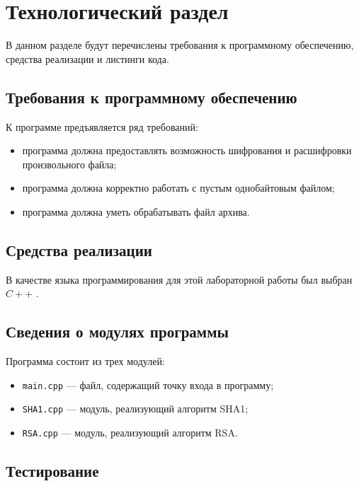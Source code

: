 \chapter{Технологический раздел}

В данном разделе будут перечислены требования к программному обеспечению, средства реализации и листинги кода.

\section{Требования к программному обеспечению}

К программе предъявляется ряд требований:

\begin{itemize} [label=--]
	\item программа должна предоставлять возможность шифрования и расшифровки произвольного файла;
	\item программа должна корректно работать с пустым однобайтовым файлом;
	\item программа должна уметь обрабатывать файл архива.
\end{itemize}

\section{Средства реализации}

В качестве языка программирования для этой лабораторной работы был выбран $C++$ \cite{pl}.

\section{Сведения о модулях программы}

Программа состоит из трех модулей: 

\begin{itemize}
	\item \texttt{main.cpp} --- файл, содержащий точку входа в программу;
	\item \texttt{SHA1.cpp} --- модуль, реализующий алгоритм SHA1;
	\item \texttt{RSA.cpp} --- модуль, реализующий алгоритм RSA.
\end{itemize}

\section{Тестирование}

